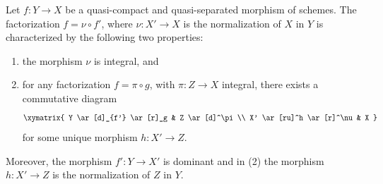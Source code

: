 \begin{lemma}
\label{lemma-characterize-normalization}
Let $f : Y \to X$ be a quasi-compact and quasi-separated morphism of schemes.
The factorization $f = \nu \circ f'$, where $\nu : X' \to X$ is the
normalization of $X$ in $Y$ is characterized by the following
two properties:
\begin{enumerate}
\item the morphism $\nu$ is integral, and
\item for any factorization $f = \pi \circ g$, with $\pi : Z \to X$
integral, there exists a commutative diagram
$$
\xymatrix{
Y \ar[d]_{f'} \ar[r]_g & Z \ar[d]^\pi \\
X' \ar[ru]^h \ar[r]^\nu & X
}
$$
for some unique morphism $h : X' \to Z$.
\end{enumerate}
Moreover, the morphism $f' : Y \to X'$ is dominant and in (2) the
morphism $h : X' \to Z$ is the normalization of $Z$ in $Y$.
\end{lemma}

